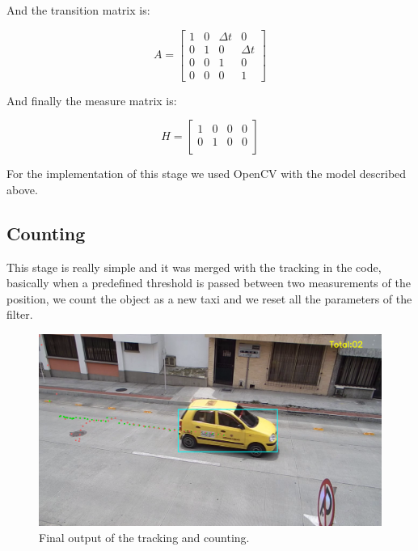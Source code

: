 \documentclass[journal]{IEEEtran}
\begin{document}
And the transition matrix is:

\begin{equation}
  A =
  \begin{bmatrix}
      1 & 0 & {\Delta}t & 0 \\
      0 & 1 & 0 & {\Delta}t \\
      0 & 0 & 1 & 0 \\
      0 & 0 & 0 & 1
  \end{bmatrix}
\end{equation}

And finally the measure matrix is:

\begin{equation}
  H =
  \begin{bmatrix}
      1 & 0 & 0 & 0 \\
      0 & 1 & 0 & 0 \\
  \end{bmatrix}
\end{equation}

For the implementation of this stage we used OpenCV with the model described
above.

\subsection{Counting}

This stage is really simple and it was merged with the tracking in the code,
basically when a predefined threshold is passed between two measurements of the
position, we count the object as a new taxi and we reset all the parameters
of the filter.

\begin{figure}[H]
  \includegraphics[scale=0.2]{../img/counting}
  \caption{Final output of the tracking and counting.}
  \label{final}
\end{figure}
\end{document}
